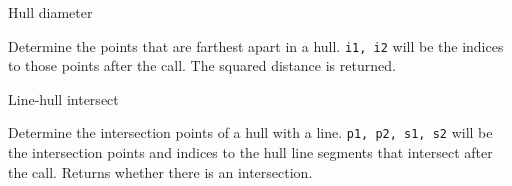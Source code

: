 \begin{algorithm}{Hull diameter}

Determine the points that are farthest apart in a hull.
{\tt i1, i2} will be the indices to those points after the call.
The squared distance is returned.
\end{algorithm}

\begin{algorithm}{Line-hull intersect}

Determine the intersection points of a hull with a line.
{\tt p1, p2, s1, s2} will be the intersection points and indices to the hull
line segments that intersect after the call. Returns whether there is an
intersection.
\end{algorithm}
